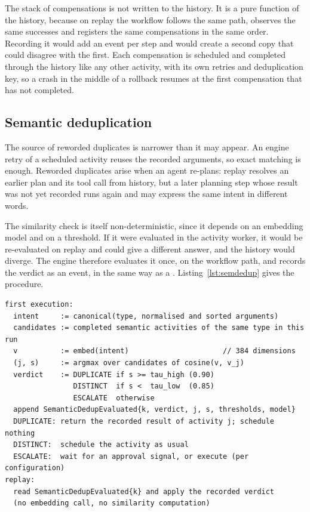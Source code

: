 The stack of compensations is not written to the history. It is a pure
function of the history, because on replay the workflow follows the same path,
observes the same successes and registers the same compensations in the same
order. Recording it would add an event per step and would create a second
copy that could disagree with the first. Each compensation is scheduled and
completed through the history like any other activity, with its own retries
and deduplication key, so a crash in the middle of a rollback resumes at the
first compensation that has not completed.

\subsection{Semantic deduplication}

The source of reworded duplicates is narrower than it may appear. An engine
retry of a scheduled activity reuses the recorded arguments, so exact matching
is enough. Reworded duplicates arise when an agent re-plans: replay resolves
an earlier plan and its tool call from history, but a later planning step
whose result was not yet recorded runs again and may express the same intent
in different words.

The similarity check is itself non-deterministic, since it depends on an
embedding model and on a threshold. If it were evaluated in the activity
worker, it would be re-evaluated on replay and could give a different answer,
and the history would diverge. The engine therefore evaluates it once, on the
workflow path, and records the verdict as an event, in the same way as a
. Listing~\ref{lst:semdedup} gives the procedure.

\begin{lstlisting}[caption={Semantic deduplication of an activity at position
  $k$}, label={lst:semdedup}]
first execution:
  intent     := canonical(type, normalised and sorted arguments)
  candidates := completed semantic activities of the same type in this run
  v          := embed(intent)                      // 384 dimensions
  (j, s)     := argmax over candidates of cosine(v, v_j)
  verdict    := DUPLICATE if s >= tau_high (0.90)
                DISTINCT  if s <  tau_low  (0.85)
                ESCALATE  otherwise
  append SemanticDedupEvaluated{k, verdict, j, s, thresholds, model}
  DUPLICATE: return the recorded result of activity j; schedule nothing
  DISTINCT:  schedule the activity as usual
  ESCALATE:  wait for an approval signal, or execute (per configuration)
replay:
  read SemanticDedupEvaluated{k} and apply the recorded verdict
  (no embedding call, no similarity computation)
\end{lstlisting}

